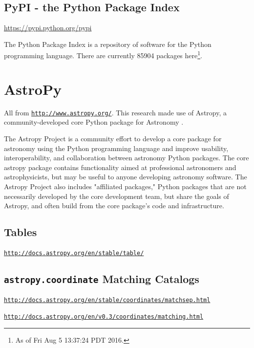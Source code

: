 \documentclass[11pt,a4paper]{article}
\begin{document}
\subsection{PyPI - the Python Package Index}
\noindent
\href{https://pypi.python.org/pypi}{https://pypi.python.org/pypi}

\noindent
The Python Package Index is a repository of software for the Python
programming language. There are currently 85904 packages
here\footnote{As of Fri Aug 5 13:37:24 PDT 2016.}.





\newpage
\section{AstroPy}
All from \href{http://www.astropy.org/}{\tt http://www.astropy.org/}.
This research made use of Astropy, a community-developed core Python
package for Astronomy \citep{Astropy13}. 

\smallskip
\smallskip
\noindent
The Astropy Project is a community effort to develop a core package
for astronomy using the Python programming language and improve
usability, interoperability, and collaboration between astronomy
Python packages. The core astropy package contains functionality aimed
at professional astronomers and astrophysicists, but may be useful to
anyone developing astronomy software. The Astropy Project also
includes "affiliated packages," Python packages that are not
necessarily developed by the core development team, but share the
goals of Astropy, and often build from the core package's code and
infrastructure.

\subsection{Tables} 
\smallskip
\smallskip
\noindent
\href{http://docs.astropy.org/en/stable/table/}{\tt http://docs.astropy.org/en/stable/table/}

\subsection{{\tt astropy.coordinate} Matching Catalogs}

\smallskip
\smallskip
\noindent
\href{http://docs.astropy.org/en/stable/coordinates/matchsep.html}{\tt http://docs.astropy.org/en/stable/coordinates/matchsep.html}

\smallskip
\smallskip
\noindent
\href{http://docs.astropy.org/en/v0.3/coordinates/matching.html}{\tt http://docs.astropy.org/en/v0.3/coordinates/matching.html}
\end{document}
